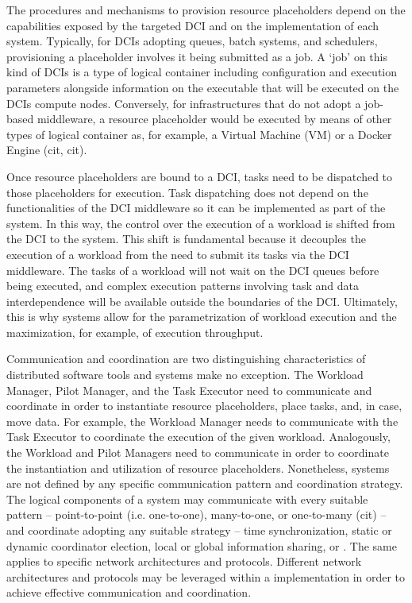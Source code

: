 \documentclass{sig-alternate}
\begin{document}
The procedures and mechanisms to provision resource placeholders depend
on the capabilities exposed by the targeted DCI and on the
implementation of each \pilot system. Typically, for DCIs adopting
queues, batch systems, and schedulers, provisioning a placeholder involves
it being submitted as a job. A `job' on this kind of DCIs is a type of
logical container including configuration and execution parameters
alongside information on the executable that will be executed on the DCIs
compute nodes. Conversely, for infrastructures that do not adopt a
job-based middleware, a resource placeholder would be executed by means
of other types of logical container as, for example, a Virtual Machine
(VM) or a Docker Engine (cit, cit).

Once resource placeholders are bound to a DCI, tasks need to be
dispatched to those placeholders for execution. Task dispatching does
not depend on the functionalities of the DCI middleware so it can be
implemented as part of the \pilot system. In this way, the control over
the execution of a workload is shifted from the DCI to the \pilot
system. This shift is fundamental because it decouples the execution of
a workload from the need to submit its tasks via the DCI middleware. The
tasks of a workload will not wait on the DCI queues before being
executed, and complex execution patterns involving task and data
interdependence will be available outside the boundaries of the DCI.
Ultimately, this is why \pilot systems allow for the parametrization of
workload execution and the maximization, for example, of execution
throughput.

Communication and coordination are two distinguishing characteristics
of distributed software tools and \pilot systems make no
exception. The Workload Manager, Pilot Manager, and the Task Executor
need to communicate and coordinate in order to instantiate resource
placeholders, place tasks, and, in case, move data. For example, the
Workload Manager needs to communicate with the Task Executor to
coordinate the execution of the given workload. Analogously, the
Workload and Pilot Managers need to communicate in order to coordinate
the instantiation and utilization of resource
placeholders. Nonetheless, \pilot systems are not defined by any
specific communication pattern and coordination strategy. The logical
components of a \pilot system may communicate with every suitable
pattern -- point-to-point (i.e.  one-to-one), many-to-one, or
one-to-many (cit) -- and coordinate adopting any suitable strategy --
time synchronization, static or dynamic coordinator election, local or
global information sharing, or \MW. The same applies to specific
network architectures and protocols.  Different network architectures
and protocols may be leveraged within a \pilot implementation in order
to achieve effective communication and coordination.  
\end{document}
